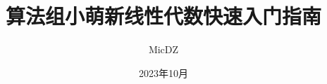 \documentclass[a4paper,12pt]{book}
\begin{document}
\author{MicDZ}
\title{算法组小萌新线性代数快速入门指南}
\date{2023年10月}

\frontmatter
\maketitle

\tableofcontents

\mainmatter






\end{document}
